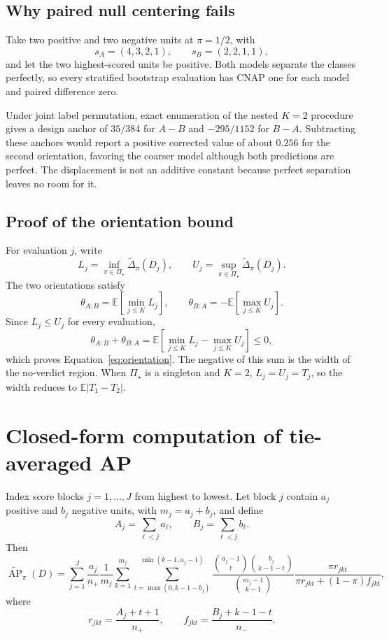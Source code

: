 \documentclass[11pt]{article}
\newcommand{\AP}{\operatorname{AP}}
\newcommand{\PSet}{\Pi_\star}
\newcommand{\E}{\mathbb{E}}
\newcommand{\APta}{\widetilde{\AP}}
\newcommand{\Dta}{\widetilde{\Delta}}
\theoremstyle{remark}
\begin{document}
\subsection{Why paired null centering fails}

Take two positive and two negative units at $\pi=1/2$, with
\[
s_A=(4,3,2,1),
\qquad
s_B=(2,2,1,1),
\]
and let the two highest-scored units be positive. Both models separate the classes perfectly, so every stratified bootstrap evaluation has CNAP one for each model and paired difference zero.

Under joint label permutation, exact enumeration of the nested $K=2$ procedure gives a design anchor of $35/384$ for $A-B$ and $-295/1152$ for $B-A$. Subtracting these anchors would report a positive corrected value of about $0.256$ for the second orientation, favoring the coarser model although both predictions are perfect. The displacement is not an additive constant because perfect separation leaves no room for it.

\subsection{Proof of the orientation bound}

For evaluation $j$, write
\[
L_j=\inf_{\pi\in\PSet}\Dta_\pi(D_j),
\qquad
U_j=\sup_{\pi\in\PSet}\Dta_\pi(D_j).
\]
The two orientations satisfy
\[
\theta_{A:B}
=
\E\left[\min_{j\leq K}L_j\right],
\qquad
\theta_{B:A}
=
-\E\left[\max_{j\leq K}U_j\right].
\]
Since $L_j\leq U_j$ for every evaluation,
\[
\theta_{A:B}+\theta_{B:A}
=
\E\left[
\min_{j\leq K}L_j-\max_{j\leq K}U_j
\right]
\leq0,
\]
which proves Equation~\eqref{eq:orientation}. The negative of this sum is the width of the no-verdict region. When $\PSet$ is a singleton and $K=2$, $L_j=U_j=T_j$, so the width reduces to $\E|T_1-T_2|$.

\section{Closed-form computation of tie-averaged AP}
\label{app:tie-computation}

Index score blocks $j=1,\ldots,J$ from highest to lowest. Let block $j$ contain $a_j$ positive and $b_j$ negative units, with $m_j=a_j+b_j$, and define
\[
A_j=\sum_{\ell<j}a_\ell,
\qquad
B_j=\sum_{\ell<j}b_\ell.
\]
Then
\begin{equation}
\APta_\pi(D)
=
\sum_{j=1}^{J}
\frac{a_j}{n_+}\frac1{m_j}
\sum_{k=1}^{m_j}
\sum_{t=\max(0,k-1-b_j)}^{\min(k-1,a_j-1)}
\frac{\binom{a_j-1}{t}\binom{b_j}{k-1-t}}
{\binom{m_j-1}{k-1}}
\frac{\pi r_{jkt}}
{\pi r_{jkt}+(1-\pi)f_{jkt}},
\label{eq:tie-closed}
\end{equation}
where
\[
r_{jkt}=\frac{A_j+t+1}{n_+},
\qquad
f_{jkt}=\frac{B_j+k-1-t}{n_-}.
\]
\end{document}
